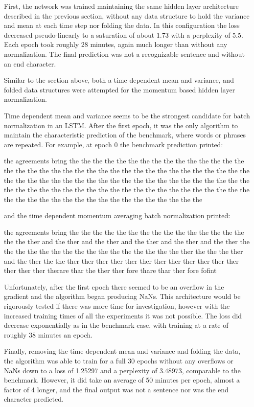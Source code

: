 \documentclass[]{article}
\begin{document}
First, the network was trained maintaining the same hidden layer architecture described in the previous section, without any data structure to hold the variance and mean at each time step nor folding the data. In this configuration the loss decreased pseudo-linearly to a saturation of about 1.73 with a perplexity of 5.5. Each epoch took roughly 28 minutes, again much longer than without any normalization. The final prediction was not a recognizable sentence and without an end character.

Similar to the section above, both a time dependent mean and variance, and folded data structures were attempted for the momentum based hidden layer normalization. 

Time dependent mean and variance seems to be the strongest candidate for batch normalization in an LSTM. After the first epoch, it was the only algorithm to maintain the characteristic prediction of the benchmark, where words or phrases are repeated. For example, at epoch 0 the benchmark prediction printed:

the agreements bring the the the the the the the the the the the the the the the the the the the the the the the the the the the the the the the the the the the the the the the the the the the the the the the the the the the the the the the the the the the the the the the the the the the the the the the the the the the the the the the the the the the the the the the the the the the the the the the

and the time dependent momentum averaging batch normalization printed:

the agreements bring the the the the the the the the the the the the the the the the the ther and the ther and the ther and the ther and the ther and the ther the the the the the the the the the the the the the the the the ther the the the ther and the ther the the ther ther ther ther ther ther ther ther ther ther ther ther ther ther ther therare thar the ther ther fore thare thar ther fore fofint

Unfortunately, after the first epoch there seemed to be an overflow in the gradient and the algorithm began producing NaNs. This architecture would be rigorously tested if there was more time for investigation, however with the increased training times of all the experiments it was not possible. The loss did decrease exponentially as in the benchmark case, with training at a rate of roughly 38 minutes an epoch. 

Finally, removing the time dependent mean and variance and folding the data, the algorithm was able to train for a full 30 epochs without any overflows or NaNs down to a loss of 1.25297 and a perplexity of 3.48973, comparable to the benchmark. However, it did take an average of 50 minutes per epoch, almost a factor of 4 longer, and the final output was not a sentence nor was the end character predicted.
\end{document}
